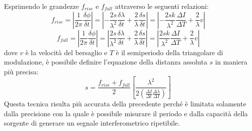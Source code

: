 \begin{enumerate}
Esprimendo le grandezze $f_{rise}$ e $f_{fall}$ attraverso le seguenti relazioni:
\begin{equation}
	f_{rise}= \left | \frac{1}{2\pi} \frac{\delta \phi}{\delta t} \right | = \left | - \frac{2s}{\lambda^2} \frac{\delta \lambda}{\delta t} + \frac{2}{\lambda} \frac{\delta s}{\delta t} \right | = \left | - \frac{2sk}{\lambda^2} \frac{\Delta I}{\Delta T} + \frac{2}{\lambda}v \right |
\end{equation}
\begin{equation}
	f_{fall}= \left | \frac{1}{2\pi} \frac{\delta \phi}{\delta t} \right | = \left | \frac{2s}{\lambda^2} \frac{\delta \lambda}{\delta t} + \frac{2}{\lambda} \frac{\delta s}{\delta t} \right | = \left | \frac{2sk}{\lambda^2} \frac{\Delta I}{\Delta T} + \frac{2}{\lambda}v \right |
\end{equation}
dove $v$ è la velocità del bersaglio e $T$ è il semiperiodo della triangolare di modulazione, è possibile definire l'equazione della distanza assoluta $s$ in maniera più precisa:
\begin{equation}
	s = \frac{f_{rise}+f_{fall}}{2} \left [ \frac{\lambda^2}{2\left ( \frac{\Delta I}{\Delta t} \frac{\Delta \lambda}{\Delta I} \right )}  \right ]
\end{equation}
Questa tecnica risulta più accurata della precedente perché è limitata solamente dalla precisione con la quale è possibile misurare il periodo e dalla capacità della sorgente di generare un segnale interferometrico ripetibile. 

\end{enumerate}